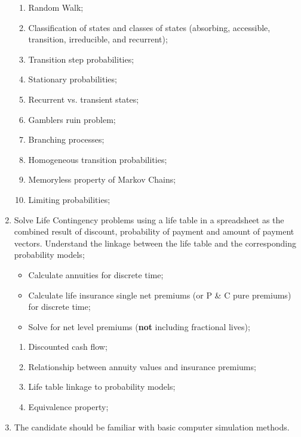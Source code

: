 \documentclass[12pt, titlepage, french]{report}
\begin{document}
\begin{outcomes}
\begin{enumerate}
\begin{itemize}
		\end{itemize}
	\begin{knowledge}
	\begin{enumerate}[label = \alph*.]
		\item	Random Walk;
		\item	Classification of states and classes of states (absorbing, accessible, transition, irreducible, and recurrent);
		\item	Transition step probabilities;
		\item	Stationary probabilities;
		\item	Recurrent vs. transient states;
		\item	Gamblers ruin problem;
		\item	Branching processes;
		\item	Homogeneous transition probabilities;
		\item	Memoryless property of Markov Chains;
		\item	Limiting probabilities;
	\end{enumerate}
	\end{knowledge}
\tcbline
	\item	Solve Life Contingency problems using a life table in a spreadsheet as the combined result of discount, probability of payment and amount of payment vectors. Understand the linkage between the life table and the corresponding probability models;
		\begin{itemize}
		\item	Calculate annuities for discrete time;
		\item	Calculate life insurance single net premiums (or P \& C pure premiums) for discrete time;
		\item	Solve for net level premiums (\textbf{not} including fractional lives);
		\end{itemize}
	\begin{knowledge}
	\begin{enumerate}[label = \alph*.]
		\item	Discounted cash flow;
		\item	Relationship between annuity values and insurance premiums;
		\item	Life table linkage to probability models;
		\item	Equivalence property;
	\end{enumerate}
	\end{knowledge}
\tcbline
	\item	The candidate should be familiar with basic computer simulation methods.

\end{enumerate}
\end{outcomes}
\end{document}
